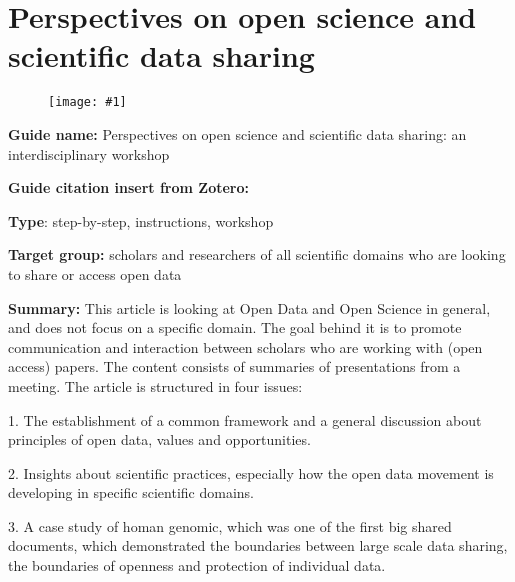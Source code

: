 \documentclass{article}
\newlength{\imgwidth}
\newcommand\scaledgraphics[2]{%
                
\settowidth{\imgwidth}{\texttt{[image: \#1]}}%
                
\setlength{\imgwidth}{\minof{\imgwidth}{#2\textwidth}}%
                
\texttt{[image: \#1]}%
                
}
\begin{document}
\section{Perspectives on open science and scientific data sharing}\label{H5120034}



\begin{center}
\begin{figure}
\scaledgraphics{6ab89e0c-e542-4afd-b586-eabe59773bc0.jpg}{0.5}
\label{F43484161}
\end{figure}


\end{center}





\textbf{Guide name:}  Perspectives on open science and scientific data sharing: an interdisciplinary workshop





\textbf{Guide citation insert from Zotero:} \autocite{destro_bisol_perspectives_2014}





\textbf{Type}: step-by-step, instructions, workshop





\textbf{Target group:} scholars and researchers of all scientific domains who are looking to share or access open data





\textbf{Summary:} This article is looking at Open Data and Open Science in general, and does not focus on a specific domain. The goal behind it is to promote communication and interaction between scholars who are working with (open access) papers. The content consists of summaries of presentations from a meeting. The article is structured in four issues:


1. The establishment of a common framework and a general discussion about principles of open data, values and opportunities.


2. Insights about scientific practices, especially how the open data movement is developing in specific scientific domains.


3. A case study of homan genomic, which was one of the first big shared documents, which demonstrated the boundaries between large scale data sharing, the boundaries of openness and protection of individual data.
\end{document}
